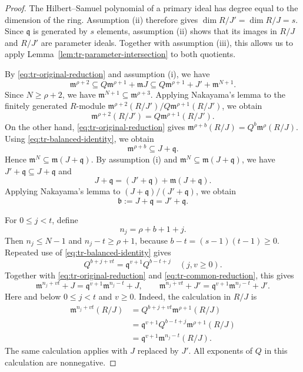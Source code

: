 \documentclass[11pt,reqno]{amsart}
\numberwithin{equation}{section}
\theoremstyle{definition}
\begin{document}
\begin{proof}
The Hilbert--Samuel polynomial of a primary ideal has degree
equal to the dimension of the ring. Assumption (ii) therefore
gives $\dim R/J'=\dim R/J=s$. Since $\mathfrak q$ is generated
by $s$ elements, assumption (ii) shows that its images in $R/J$
and $R/J'$ are parameter ideals. Together with assumption (iii),
this allows us to apply Lemma~\ref{lem:tr-parameter-intersection}
to both quotients.

By \eqref{eq:tr-original-reduction} and assumption (i), we have
\[
 \mathfrak m^{\rho+2}
 \subseteq Q\mathfrak m^{\rho+1}+\mathfrak mJ
 \subseteq Q\mathfrak m^{\rho+1}+J'+\mathfrak m^{N+1}.
\]
Since $N\geq\rho+2$, we have
$\mathfrak m^{N+1}\subseteq\mathfrak m^{\rho+3}$.
Applying Nakayama's lemma to the finitely generated $R$-module
$\mathfrak m^{\rho+2}(R/J')/Q\mathfrak m^{\rho+1}(R/J')$,
we obtain
\begin{equation}\label{eq:tr-common-reduction}
 \mathfrak m^{\rho+2}(R/J')=Q\mathfrak m^{\rho+1}(R/J').
\end{equation}
On the other hand, \eqref{eq:tr-original-reduction} gives
$\mathfrak m^{\rho+b}(R/J)=Q^b\mathfrak m^\rho(R/J)$.
Using \eqref{eq:tr-balanced-identity}, we obtain
\[
 \mathfrak m^{\rho+b}\subseteq J+\mathfrak q.
\]
Hence $\mathfrak m^N\subseteq\mathfrak m(J+\mathfrak q)$.
By assumption (i) and $\mathfrak m^N\subseteq\mathfrak m(J+\mathfrak q)$,
we have $J'+\mathfrak q\subseteq J+\mathfrak q$ and
\[
 J+\mathfrak q=(J'+\mathfrak q)+\mathfrak m(J+\mathfrak q).
\]
Applying Nakayama's lemma to $(J+\mathfrak q)/(J'+\mathfrak q)$,
we obtain
\begin{equation}\label{eq:tr-common-K}
 \mathfrak b:=J+\mathfrak q=J'+\mathfrak q.
\end{equation}

For $0\leq j<t$, define
\[
 n_j=\rho+b+1+j.
\]
Then $n_j\leq N-1$ and
$n_j-t\geq\rho+1$, because $b-t=(s-1)(t-1)\geq0$.
Repeated use of \eqref{eq:tr-balanced-identity} gives
\[
 Q^{b+j+vt}=\mathfrak q^{v+1}Q^{b-t+j}
 \quad(j,v\geq0).
\]
Together with \eqref{eq:tr-original-reduction} and
\eqref{eq:tr-common-reduction}, this gives
\begin{equation}\label{eq:tr-all-residues}
 \mathfrak m^{n_j+vt}+J
   =\mathfrak q^{v+1}\mathfrak m^{n_j-t}+J,
 \qquad
 \mathfrak m^{n_j+vt}+J'
   =\mathfrak q^{v+1}\mathfrak m^{n_j-t}+J'.
\end{equation}
Here and below $0\leq j<t$ and $v\geq0$.
Indeed, the calculation in $R/J$ is
\[
 \begin{aligned}
 \mathfrak m^{n_j+vt}(R/J)
 &=Q^{b+j+vt}\mathfrak m^{\rho+1}(R/J)\\
 &=\mathfrak q^{v+1}Q^{b-t+j}\mathfrak m^{\rho+1}(R/J)\\
 &=\mathfrak q^{v+1}\mathfrak m^{n_j-t}(R/J).
 \end{aligned}
\]
The same calculation applies with $J$ replaced by $J'$.
All exponents of $Q$ in this calculation are nonnegative.


\end{proof}
\end{document}
